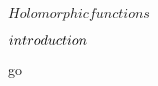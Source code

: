 \documentclass[../Main/main]{subfiles}
\begin{document}
\unit{ $ Holomorphic functions $ }
{
	\introduction
	{ 
		$introduction\\$ 
	}

	go

}
\end{document}
